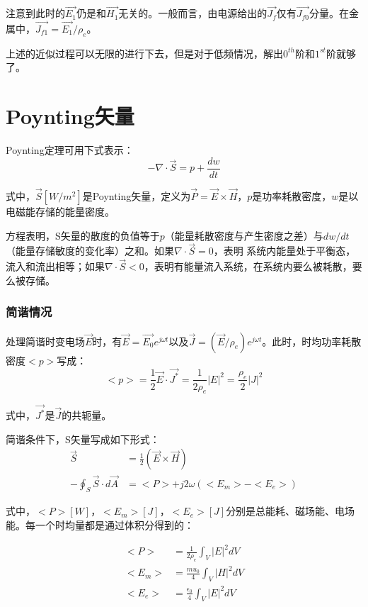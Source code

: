 注意到此时的$\vec{E_1}$仍是和$\vec{H_1}$无关的。一般而言，由电源给出的$\vec{J_f}$仅有$\vec{J_{f0}}$分量。在金属中，$\vec{J_{f1}}=\vec{E_1}/\rho_e$。

上述的近似过程可以无限的进行下去，但是对于低频情况，解出$0^{th}$阶和$1^{st}$阶就够了。

\section{Poynting矢量}
Poynting定理可用下式表示：
\begin{equation}\label{eqn:poynting}
-\nabla\cdot \vec{S}=p+\frac{dw}{dt}
\end{equation}

式中，$\vec{S}[W/m^2]$是Poynting矢量，定义为$\vec{P}=\vec{E}\times \vec{H}$，$p$是功率耗散密度，$w$是以电磁能存储的能量密度。

方程表明，S矢量的散度的负值等于$p$（能量耗散密度与产生密度之差）与$dw/dt$（能量存储敏度的变化率）之和。如果$\nabla \cdot \vec{S}=0$，表明
系统内能量处于平衡态，流入和流出相等；如果$\nabla \cdot \vec{S}<0$，表明有能量流入系统，在系统内要么被耗散，要么被存储。

\subsubsection{简谐情况}
处理简谐时变电场$\vec{E}$时，有$\vec{E}=\vec{E_0}e^{j\omega t}$以及$\vec{J}=(\vec{E}/\rho_e)e^{j\omega t}$。此时，时均功率耗散密度$<p>$写成：
\begin{equation}\label{eqn:poynting sincase}
  <p>=\frac{1}{2}\vec{E}\cdot \vec{J^*}=\frac{1}{2\rho_e}|E|^2=\frac{\rho_e}{2}|J|^2
\end{equation}

式中，$\vec{J^*}$是$\vec{J}$的共轭量。

简谐条件下，S矢量写成如下形式：
\begin{subequations}\label{eqn:poynting s-vector sin}
	\begin{align}
\vec{S}&=\frac{1}{2}(\vec{E}\times \vec{H}) \\
-\oint_S \vec{S}\cdot d\vec{A}&=<P>+j2\omega (<E_m>-<E_e>)
	\end{align}
\end{subequations}

式中，$<P>[W]$，$<E_m>[J]$，$<E_e>[J]$分别是总能耗、磁场能、电场能。每一个时均量都是通过体积分得到的：

\begin{subequations}\label{eqn:poynting power sin}
	\begin{align}
<P>&= \frac{1}{2\rho_e}\int_V|E|^2dV\\
<E_m>&= \frac{mu_0}{4}\int_V|H|^2dV \\
<E_e>&= \frac{\epsilon_0}{4}\int_V|E|^2dV
	\end{align}
\end{subequations}

